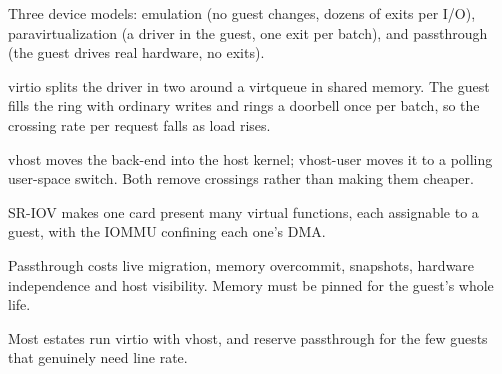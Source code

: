 \begin{chaptersummary}
\begin{tight}
  \item Three device models: emulation (no guest changes, dozens of exits per
        I/O), paravirtualization (a driver in the guest, one exit per batch),
        and passthrough (the guest drives real hardware, no exits).
  \item virtio splits the driver in two around a virtqueue in shared memory.
        The guest fills the ring with ordinary writes and rings a doorbell once
        per batch, so the crossing rate per request falls as load rises.
  \item vhost moves the back-end into the host kernel; vhost-user moves it to a
        polling user-space switch. Both remove crossings rather than making
        them cheaper.
  \item SR-IOV makes one card present many virtual functions, each assignable
        to a guest, with the IOMMU confining each one's DMA.
  \item Passthrough costs live migration, memory overcommit, snapshots,
        hardware independence and host visibility. Memory must be pinned for
        the guest's whole life.
  \item Most estates run virtio with vhost, and reserve passthrough for the few
        guests that genuinely need line rate.
\end{tight}
\end{chaptersummary}

